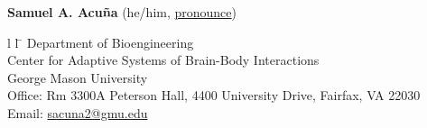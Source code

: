 \documentclass[letterpaper, 10pt]{article}
\begin{document}
% 

{\LARGE \textbf{Samuel A. Acuña}}
{\small \hspace{8pt}  (he/him, \href{https://namedrop.io/samuelacuna}{pronounce})}

\begin{tabbing}{l l}
     \hspace{1cm} \= \hspace{10cm} \kill %
     Department of Bioengineering\\
     Center for Adaptive Systems of Brain-Body Interactions\\
     George Mason University\\
     Office: \> Rm 3300A Peterson Hall, 4400 University Drive, Fairfax, VA 22030\\
     Email: \> \href{mailto:sacuna2@gmu.edu}{sacuna2@gmu.edu}
\end{tabbing}


\end{document}
